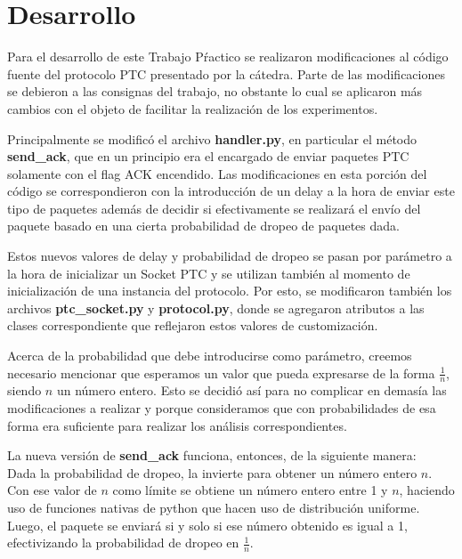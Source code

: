 \section{Desarrollo}

Para el desarrollo de este Trabajo Pŕactico se realizaron modificaciones al código fuente del protocolo PTC presentado por la cátedra. Parte de las modificaciones se debieron a las consignas del trabajo, no obstante lo cual se aplicaron más cambios con el objeto de facilitar la realización de los experimentos.\newline

Principalmente se modificó el archivo \textbf{handler.py}, en particular el método \textbf{send\_ack}, que en un principio era el encargado de enviar paquetes PTC solamente con el flag ACK encendido. Las modificaciones en esta porción del código se correspondieron con la introducción de un delay a la hora de enviar este tipo de paquetes además de decidir si efectivamente se realizará el envío del paquete basado en una cierta probabilidad de dropeo de paquetes dada.\newline

Estos nuevos  valores de delay y probabilidad de dropeo se pasan por parámetro a la hora de inicializar un Socket PTC y se utilizan también al momento de inicialización de una instancia del protocolo. Por esto, se modificaron también los archivos \textbf{ptc\_socket.py} y \textbf{protocol.py}, donde se agregaron atributos a las clases correspondiente que reflejaron estos valores de customización.\newline

Acerca de la probabilidad que debe introducirse como parámetro, creemos necesario mencionar que esperamos un valor que pueda expresarse de la forma $\frac{1}{n}$, siendo $n$ un número entero. Esto se decidió así para no complicar en demasía las modificaciones a realizar y porque consideramos que con probabilidades de esa forma era suficiente para realizar los análisis correspondientes.\newline

La nueva versión de \textbf{send\_ack} funciona, entonces, de la siguiente manera:\\
Dada la probabilidad de dropeo, la invierte para obtener un número entero $n$. Con ese valor de $n$ como límite se obtiene un número entero entre 1 y $n$, haciendo uso de funciones nativas de python que hacen uso de distribución uniforme. Luego, el paquete se enviará si y solo si ese número obtenido es igual a 1, efectivizando la probabilidad de dropeo en $\frac{1}{n}$.\newline

